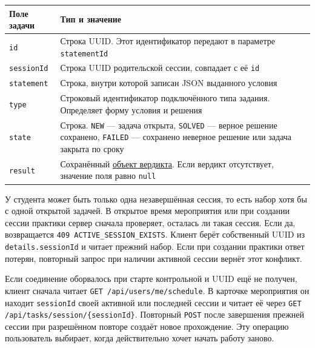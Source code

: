 \documentclass[12pt,a4paper]{article}
\newcounter{none} %
\begin{document}
{\def\LTcaptype{none} %
\begin{longtable}[]{@{}
  >{\raggedright\arraybackslash}p{}
  >{\raggedright\arraybackslash}p{}@{}}
\toprule\noalign{}
\begin{minipage}[b]{\linewidth}\raggedright
Поле задачи
\end{minipage} & \begin{minipage}[b]{\linewidth}\raggedright
Тип и значение
\end{minipage} \\
\midrule\noalign{}
\endhead
\bottomrule\noalign{}
\endlastfoot
\texttt{id} & Строка UUID. Этот идентификатор передают в параметре \texttt{statement\allowbreak{}Id} \\
\texttt{sessionId} & Строка UUID родительской сессии, совпадает с её \texttt{id} \\
\texttt{statement} & Строка, внутри которой записан JSON выданного условия \\
\texttt{type} & Строковый идентификатор подключённого типа задания. Определяет форму условия и решения \\
\texttt{state} & Строка. \texttt{NEW} --- задача открыта, \texttt{SOLVED} --- верное решение сохранено, \texttt{FAILED} --- сохранено неверное решение или задача закрыта по сроку \\
\texttt{result} & Сохранённый {\hyperlink{2-отправка-решения}{объект вердикта}}. Если вердикт отсутствует, значение поля равно \texttt{null} \\
\end{longtable}
}

У студента может быть только одна незавершённая сессия, то есть набор хотя бы с одной открытой задачей. В открытое время мероприятия или при создании сессии практики сервер сначала проверяет, осталась ли такая сессия. Если да, возвращается \texttt{409 ACTIVE\_\allowbreak{}SESSION\_\allowbreak{}EXISTS}. Клиент берёт собственный UUID из \texttt{details.\allowbreak{}session\allowbreak{}Id} и читает прежний набор. Если при создании практики ответ потерян, повторный запрос при наличии активной сессии вернёт этот конфликт.

Если соединение оборвалось при старте контрольной и UUID ещё не получен, клиент сначала читает \texttt{GET /\allowbreak{}api/\allowbreak{}users/\allowbreak{}me/\allowbreak{}schedule}. В карточке мероприятия он находит \texttt{sessionId} своей активной или последней сессии и читает её через \texttt{GET /\allowbreak{}api/\allowbreak{}tasks/\allowbreak{}session/\allowbreak{}\{session\allowbreak{}Id\}}. Повторный \texttt{POST} после завершения прежней сессии при разрешённом повторе создаёт новое прохождение. Эту операцию пользователь выбирает, когда действительно хочет начать работу заново.
\end{document}
